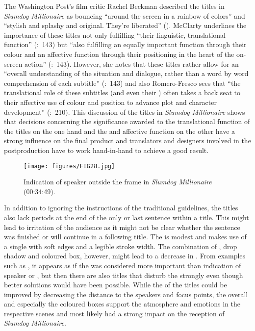 The Washington Post’s film critic Rachel Beckman described the titles in \textit{Slumdog Millionaire} as bouncing “around the screen in a rainbow of colors” \citep{Beckman2008} and “stylish and splashy and original. They’re liberated” (\citeyear{Beckman2008}). McClarty underlines the importance of these titles not only fulfilling “their linguistic, translational function” (\citealt{mcclarty2012}:~143) but “also fulfilling an equally important  function through their colour and an affective function through their positioning in the heart of the on-screen action” (\citeyear{mcclarty2012}:~143). However, she notes that these titles rather allow for an “overall understanding of the situation and dialogue, rather than a word by word comprehension of each subtitle” (\citeyear{mcclarty2012}:~143) and also Romero-Fresco sees that “the translational role of these subtitles (and even their ) often takes a back seat to their affective use of colour and position to advance plot and character development” (\citealt{romero-fresco2013}:~210). This discussion of the titles in \textit{Slumdog Millionaire} shows that decisions concerning the significance awarded to the translational function of the titles on the one hand and the  and affective function on the other have a strong influence on the final product and translators and designers involved in the postproduction have to work hand-in-hand to achieve a good result.

\begin{figure}
\texttt{[image: figures/FIG28.jpg]}
\caption{Indication of speaker outside the frame in \textit{Slumdog Millionaire} (00:34:49).}
\label{fig:FIG28}
\end{figure}

In addition to ignoring the  instructions of the traditional guidelines, the titles also lack periods at the end of the only or last sentence within a title. This might lead to irritation of the audience as it might not be clear whether the sentence was finished or will continue in a following title. The  is modest and makes use of a single  with soft edges and a legible stroke width. The combination of , drop shadow and coloured box, however, might lead to a decrease in . From examples such as , it appears as if the  was considered more important than indication of speaker or , but then there are also titles that disturb the  strongly even though better solutions would have been possible. While the  of the titles could be improved by decreasing the distance to the speakers and focus points, the overall  and especially the coloured boxes support the atmosphere and emotions in the respective scenes and most likely had a strong impact on the reception of \textit{Slumdog Millionaire}.

